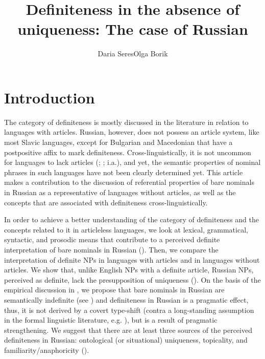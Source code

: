 \documentclass[output=paper,
colorlinks,
citecolor=brown,
newtxmath
]{langscibook}
\author{Daria Seres\affiliation{Universitat Autònoma de Barcelona (UAB)}\orcid{0000-0002-9044-8516}\lastand Olga Borik\affiliation{Universidad Nacional de Educación a Distancia (UNED)}\orcid{0000-0003-1255-5962}}
\title{Definiteness in the absence of uniqueness: The case of Russian}
\begin{document}
\maketitle


\section{Introduction} \label{intro}
The category of definiteness is mostly discussed in the literature in relation to languages with articles. Russian, however, does not possess an article system, like most Slavic languages, except for Bulgarian and Macedonian that have a postpositive affix to mark definiteness. Cross-linguistically, it is not uncommon for languages to lack articles (\citealt{Lyons1999}; %
\citealt{Dryer2013}; %
i.a.), and yet, the semantic properties of nominal phrases in such languages have not been clearly determined yet. This article makes a contribution to the discussion of referential properties of bare nominals in Russian as a representative of languages without articles, as well as the concepts that are associated with definiteness cross-linguistically. %

In order to achieve a better understanding of the category of definiteness and the concepts related to it in articleless languages, we look at lexical, grammatical, syntactic, and prosodic means that contribute to a perceived definite interpretation of bare nominals in Russian (). Then, we compare the interpretation of definite NPs in languages with articles and in languages without articles. %
We show that, unlike English NPs with a definite article, Russian NPs, perceived as definite, lack the presupposition of uniqueness (). On the basis of the empirical discussion in , we propose that bare nominals in Russian are semantically indefinite (see \citealt{Heim2011}) and definiteness in Russian is a pragmatic effect, thus, it is not derived by a covert type-shift (contra a long-standing assumption in the formal linguistic literature, e.g. \citealt{Chierchia1998}), but is a result of pragmatic strengthening. We suggest that there are at least three sources of the perceived definiteness in Russian: ontological (or situational) uniqueness, topicality, and familiarity/anaphoricity ().
\end{document}

